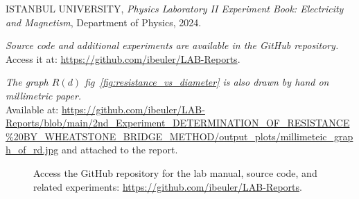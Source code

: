 \documentclass[journal]{IEEEtran}
\begin{document}
\begin{thebibliography}{9}
    ISTANBUL UNIVERSITY, 
    \textit{Physics Laboratory II Experiment Book: Electricity and Magnetism}, 
    Department of Physics, 2024.

    \textit{Source code and additional experiments are available in the GitHub repository.} \\ 
    Access it at: \url{https://github.com/ibeuler/LAB-Reports}.

    \textit{The graph $R(d)$ fig~\ref{fig:resistance_vs_diameter} is also 
    drawn by hand on millimetric paper.}\\
    Available at: \url{https://github.com/ibeuler/LAB-Reports/blob/main/2nd_Experiment_DETERMINATION_OF_RESISTANCE%20BY_WHEATSTONE_BRIDGE_METHOD/output_plots/millimeteic_graph_of_rd.jpg}
    and attached to the report.

\end{thebibliography}

\begin{figure}[H]
    \centering
    \begin{minipage}{0.15\textwidth}
        \centering
    \end{minipage}%
    \begin{minipage}{0.2\textwidth}
        \raggedright
        \caption{Access the GitHub repository for the lab manual, source code, and related experiments: \href{https://github.com/ibeuler/LAB-Reports}{\url{https://github.com/ibeuler/LAB-Reports}}.}
        \label{fig:qr}
    \end{minipage}
\end{figure}
\end{document}
